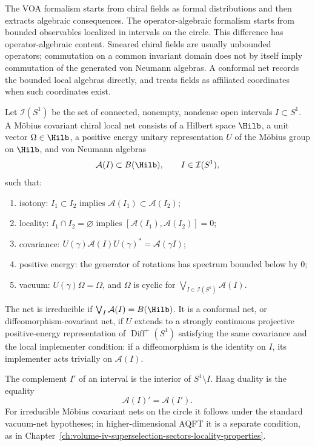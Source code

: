 The VOA formalism starts from chiral fields as formal distributions and then
extracts algebraic consequences.  The operator-algebraic formalism starts
from bounded observables localized in intervals on the circle.  This
difference has operator-algebraic content.  Smeared chiral fields are usually unbounded
operators; commutation on a common invariant domain does not by itself imply
commutation of the generated von Neumann algebras.  A conformal net records
the bounded local algebras directly, and treats fields as affiliated
coordinates when such coordinates exist.

\begin{definition}
\label{def:chiral-conformal-net}
Let \(\mathcal I(S^1)\) be the set of connected, nonempty, nondense open
intervals \(I\subset S^1\).  A M\"obius covariant chiral local net consists
of a Hilbert space \(\Hilb\), a unit vector \(\Omega\in\Hilb\), a positive
energy unitary representation \(U\) of the M\"obius group on \(\Hilb\), and
von Neumann algebras
\[
  \mathcal A(I)\subset B(\Hilb),\qquad I\in\mathcal I(S^1),
\]
such that:
\begin{enumerate}
\item isotony:
  \(I_1\subset I_2\) implies \(\mathcal A(I_1)\subset\mathcal A(I_2)\);
\item locality:
  \(I_1\cap I_2=\varnothing\) implies
  \([\mathcal A(I_1),\mathcal A(I_2)]=0\);
\item covariance:
  \(U(\gamma)\mathcal A(I)U(\gamma)^*=\mathcal A(\gamma I)\);
\item positive energy:
  the generator of rotations has spectrum bounded below by \(0\);
\item vacuum:
  \(U(\gamma)\Omega=\Omega\), and
  \(\Omega\) is cyclic for
  \(\bigvee_{I\in\mathcal I(S^1)}\mathcal A(I)\).
\end{enumerate}
The net is irreducible if
\(\bigvee_I\mathcal A(I)=B(\Hilb)\).  It is a conformal net, or
diffeomorphism-covariant net, if \(U\) extends to a strongly continuous
projective positive-energy representation of
\(\operatorname{Diff}^+(S^1)\) satisfying the same covariance and the local
implementer condition: if a diffeomorphism is the identity on \(I\), its
implementer acts trivially on \(\mathcal A(I)\).
\end{definition}

The complement \(I'\) of an interval is the interior of
\(S^1\setminus I\).  Haag duality is the equality
\[
  \mathcal A(I)'=\mathcal A(I') .
\]
For irreducible M\"obius covariant nets on the circle it follows under the
standard vacuum-net hypotheses; in higher-dimensional AQFT it is a separate
condition, as in
Chapter~\ref{ch:volume-iv-superselection-sectors-locality-properties}.

